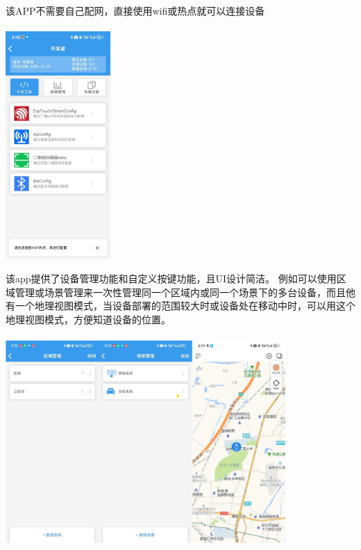 \documentclass[16pt]{beamer}	%
\begin{document}
	   	\begin{frame}
	    该APP不需要自己配网，直接使用wifi或热点就可以连接设备
	    	\\ \hspace*{\fill} \\\centering \includegraphics[width=0.3\textwidth]{pic/4-3.png}
	    \end{frame}	
	    \begin{frame}
	    该app提供了设备管理功能和自定义按键功能，且UI设计简洁。
	    例如可以使用区域管理或场景管理来一次性管理同一个区域内或同一个场景下的多台设备，而且他有一个地理视图模式，当设备部署的范围较大时或设备处在移动中时，可以用这个地理视图模式，方便知道设备的位置。
	    	\\ \hspace*{\fill} \\\centering \includegraphics[width=0.8\textwidth]{pic/4-4.png}
	    \end{frame}	
\end{document}
